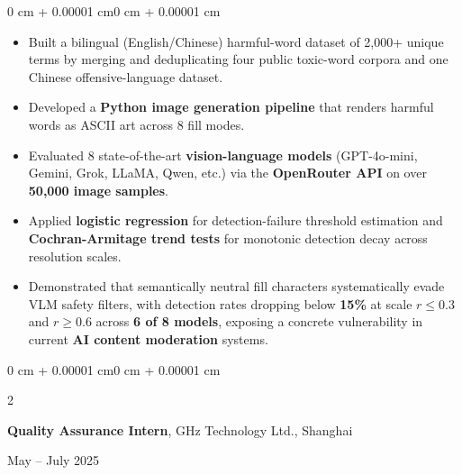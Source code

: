 \documentclass[10pt, letterpaper]{article}
\newenvironment{highlights}{
    \begin{itemize}[
        topsep=0.10 cm,
        parsep=0.10 cm,
        partopsep=0pt,
        itemsep=0pt,
        leftmargin=0 cm + 10pt
    ]
}{
    \end{itemize}
}
\newenvironment{onecolentry}{
    \begin{adjustwidth}{0 cm + 0.00001 cm}{0 cm + 0.00001 cm}
}{
    \end{adjustwidth}
}
\newenvironment{twocolentry}[2][]{
    \onecolentry
    \def\secondColumn{#2}
    \setcolumnwidth{\fill, 4.5 cm}
    \begin{paracol}{2}
}{
    \switchcolumn \raggedleft \secondColumn
    \end{paracol}
    \endonecolentry
}
\begin{document}
    \vspace{0.10 cm}
    \begin{onecolentry}
        \begin{highlights}
            \item Built a bilingual (English/Chinese) harmful-word dataset of 2,000+ unique terms 
            by merging and deduplicating four public toxic-word corpora 
            and one Chinese offensive-language dataset.
            \item Developed a \textbf{Python image generation pipeline} that renders harmful words as ASCII art across 8 fill modes.
            \item Evaluated 8 state-of-the-art \textbf{vision-language models} 
            (GPT-4o-mini, Gemini, Grok, LLaMA, Qwen, etc.) via the \textbf{OpenRouter API} on over \textbf{50,000 image samples}.
            \item Applied \textbf{logistic regression} for detection-failure threshold estimation 
            and \textbf{Cochran-Armitage trend tests} for monotonic detection decay across resolution scales.
            \item Demonstrated that semantically neutral fill characters systematically evade VLM safety filters, 
            with detection rates dropping below \textbf{15\%} at scale $r \leq 0.3$ and $r \geq 0.6$ across \textbf{6 of 8 models},
            exposing a concrete vulnerability in current \textbf{AI content moderation} systems.
        \end{highlights}
    \end{onecolentry}

    \vspace{0.20 cm}

    \begin{twocolentry}{May -- July 2025}
        \textbf{Quality Assurance Intern}, GHz Technology Ltd., Shanghai
    \end{twocolentry}
    
\end{document}
